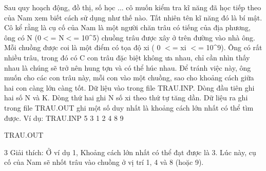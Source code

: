 

Sau quy hoạch động, đồ thị, số học ... cô muốn kiểm tra kĩ năng đã học tiếp theo của Nam
xem biết cách sử dụng như thế nào. Tất nhiên tên kĩ năng đó là bí mật. Cô kể rằng là cụ
cố của Nam là một người chăn trâu có tiếng của địa phương, ông có N (0$<$= N$<$= 10\textasciicircum5)
chuồng trâu được xây ở trên đường vào nhà ông. Mỗi chuồng được coi là một điểm có
tọa độ xi ( 0 $<$= xi $<$= 10\textasciicircum9). Ông có rất nhiều trâu, trong đó có C con trâu đặc biệt không
ưa nhau, chỉ cần nhìn thấy nhau là chúng sẽ trở nên hung tợn và có thể húc nhau. Để
tránh việc này, ông muốn cho các con trâu này, mỗi con vào một chuồng, sao cho khoảng
cách giữa hai con càng lớn càng tốt.
Dữ liệu vào trong file TRAU.INP. Dòng đầu tiên ghi hai số N và K. Dòng thứ hai ghi N
số xi theo thứ tự tăng dần.
Dữ liệu ra ghi trong file TRAU.OUT ghi một số duy nhất là khoảng cách lớn nhất có thể
tìm được.
Ví dụ:
TRAU.INP 
5 3
1 2 4 8 9


TRAU.OUT

3
Giải thích: Ở ví dụ 1, Khoảng cách lớn nhất có thể đạt được là 3. Lúc này, cụ cố của Nam
sẽ nhốt trâu vào chuồng ở vị trí 1, 4 và 8 (hoặc 9).

